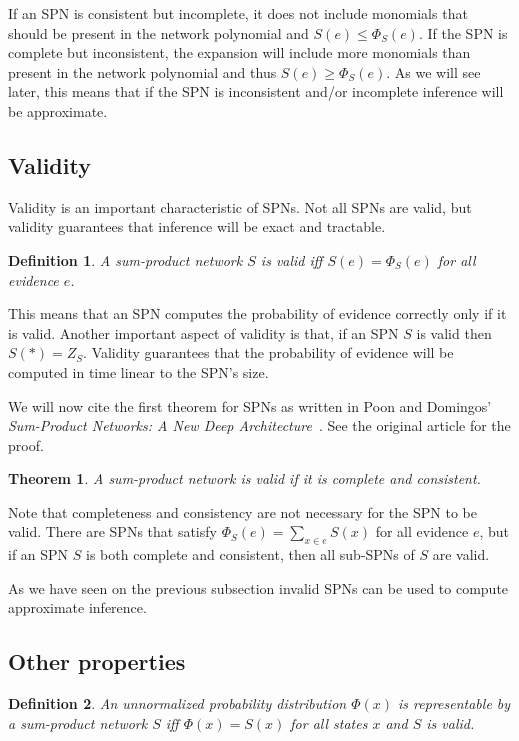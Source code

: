 \documentclass[a4paper,10pt]{article}
\theoremstyle{plain}
\newtheorem*{spn-def}{Definition}
\newtheorem*{spn-thm}{Theorem}
\begin{document}
If an SPN is consistent but incomplete, it does not include monomials that should be present in the
network polynomial and $S(e) \leq \Phi_S(e)$. If the SPN is complete but inconsistent, the
expansion will include more monomials than present in the network polynomial and thus $S(e)\geq
\Phi_S(e)$. As we will see later, this means that if the SPN is inconsistent and/or incomplete
inference will be approximate.

\subsection{Validity}

Validity is an important characteristic of SPNs. Not all SPNs are valid, but validity guarantees
that inference will be exact and tractable.

\begin{spn-def}
  A sum-product network $S$ is valid iff $S(e)=\Phi_S(e)$ for all evidence $e$.
\end{spn-def}

This means that an SPN computes the probability of evidence correctly only if it is valid. Another
important aspect of validity is that, if an SPN $S$ is valid then $S(*)=Z_S$. Validity guarantees
that the probability of evidence will be computed in time linear to the SPN's size.

We will now cite the first theorem for SPNs as written in Poon and Domingos' \textit{Sum-Product
Networks: A New Deep Architecture}~\cite{poon-domingos}. See the original article for the proof.

\begin{spn-thm}
  A sum-product network is valid if it is complete and consistent.
\end{spn-thm}

Note that completeness and consistency are not necessary for the SPN to be valid. There are SPNs
that satisfy $\Phi_S(e)=\sum_{x\in e}S(x)$ for all evidence $e$, but if an SPN $S$ is both complete
and consistent, then all sub-SPNs of $S$ are valid.

As we have seen on the previous subsection invalid SPNs can be used to compute approximate
inference.

\subsection{Other properties}

\begin{spn-def}
  An unnormalized probability distribution $\Phi(x)$ is representable by a sum-product network $S$
  iff $\Phi(x)=S(x)$ for all states $x$ and $S$ is valid.
\end{spn-def}
\end{document}
